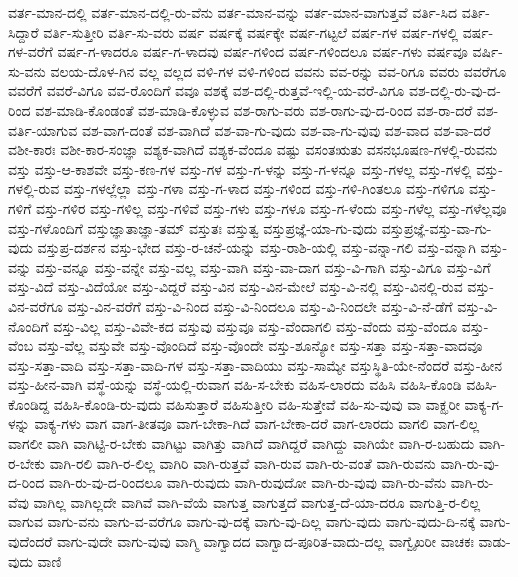{ವರ್ತ-ಮಾನ-ದಲ್ಲಿ
ವರ್ತ-ಮಾನ-ದಲ್ಲಿ-ರು-ವೆನು
ವರ್ತ-ಮಾನ-ವನ್ನು
ವರ್ತ-ಮಾನ-ವಾಗುತ್ತವೆ
ವರ್ತಿ-ಸಿದ
ವರ್ತಿ-ಸಿದ್ದಾರೆ
ವರ್ತಿ-ಸುತ್ತೀರಿ
ವರ್ತಿ-ಸು-ವರು
ವರ್ಷ
ವರ್ಷಕ್ಕೆ
ವರ್ಷಕ್ಕೇ
ವರ್ಷ-ಗಟ್ಟಲೆ
ವರ್ಷ-ಗಳ
ವರ್ಷ-ಗಳಲ್ಲಿ
ವರ್ಷ-ಗಳ-ವರೆಗೆ
ವರ್ಷ-ಗ-ಳಾದರೂ
ವರ್ಷ-ಗ-ಳಾದವು
ವರ್ಷ-ಗಳಿಂದ
ವರ್ಷ-ಗಳಿಂದಲೂ
ವರ್ಷ-ಗಳು
ವರ್ಷವೂ
ವರ್ಷಿ-ಸು-ವನು
ವಲಯ-ದೊಳ-ಗಿನ
ವಲ್ಲ
ವಲ್ಲದ
ವಳಿ-ಗಳ
ವಳಿ-ಗಳಿಂದ
ವವನು
ವವ-ರನ್ನು
ವವ-ರಿಗೂ
ವವರು
ವವರೆಗೂ
ವವರೆಗೆ
ವವರೆ-ವಿಗೂ
ವವ-ರೊಂದಿಗೆ
ವವೂ
ವಶಕ್ಕೆ
ವಶ-ದಲ್ಲಿ-ರುತ್ತವೆ-ಇಲ್ಲಿ-ಯ-ವರೆ-ವಿಗೂ
ವಶ-ದಲ್ಲಿ-ರು-ವು-ದ-ರಿಂದ
ವಶ-ಮಾಡಿ-ಕೊಂಡಂತೆ
ವಶ-ಮಾಡಿ-ಕೊಳ್ಳುವ
ವಶ-ರಾಗು-ವರು
ವಶ-ರಾಗು-ವು-ದ-ರಿಂದ
ವಶ-ರಾ-ದರೆ
ವಶ-ವರ್ತಿ-ಯಾಗುವ
ವಶ-ವಾಗ-ದಂತೆ
ವಶ-ವಾಗಿದೆ
ವಶ-ವಾ-ಗು-ವುದು
ವಶ-ವಾ-ಗು-ವುವು
ವಶ-ವಾದ
ವಶ-ವಾ-ದರೆ
ವಶೀ-ಕಾರಃ
ವಶೀ-ಕಾರ-ಸಂಜ್ಞಾ
ವಶ್ಯಕ-ವಾಗಿದೆ
ವಶ್ಯಕ-ವೆಂದೂ
ವಷ್ಟು
ವಸಂತಋತು
ವಸನಭೂಷಣ-ಗಳಲ್ಲಿ-ರುವನು
ವಸ್ತು
ವಸ್ತು-ಆ-ಕಾಶವೇ
ವಸ್ತು-ಕಣ-ಗಳ
ವಸ್ತು-ಗಳ
ವಸ್ತು-ಗ-ಳನ್ನು
ವಸ್ತು-ಗ-ಳನ್ನೂ
ವಸ್ತು-ಗಳಲ್ಲ
ವಸ್ತು-ಗಳಲ್ಲಿ
ವಸ್ತು-ಗಳಲ್ಲಿ-ರುವ
ವಸ್ತು-ಗಳಲ್ಲೆಲ್ಲಾ
ವಸ್ತು-ಗಳಾ
ವಸ್ತು-ಗ-ಳಾದ
ವಸ್ತು-ಗಳಿಂದ
ವಸ್ತು-ಗಳಿ-ಗಿಂತಲೂ
ವಸ್ತು-ಗಳಿಗೂ
ವಸ್ತು-ಗಳಿಗೆ
ವಸ್ತು-ಗಳಿರ
ವಸ್ತು-ಗಳಿಲ್ಲ
ವಸ್ತು-ಗಳಿವೆ
ವಸ್ತು-ಗಳು
ವಸ್ತು-ಗಳೂ
ವಸ್ತು-ಗ-ಳೆಂದು
ವಸ್ತು-ಗಳೆಲ್ಲ
ವಸ್ತು-ಗಳೆಲ್ಲವೂ
ವಸ್ತು-ಗಳೊಂದಿಗೆ
ವಸ್ತುಜ್ಞಾತಾಜ್ಞಾ-ತಮ್
ವಸ್ತುತಃ
ವಸ್ತುತ್ವ
ವಸ್ತುಪ್ರಜ್ಞೆ-ಯಾ-ಗು-ವುದು
ವಸ್ತುಪ್ರಜ್ಞೆ-ವಸ್ತು-ವಾ-ಗು-ವುದು
ವಸ್ತುಪ್ರ-ದರ್ಶನ
ವಸ್ತು-ಭೇದ
ವಸ್ತು-ರ-ಚನೆ-ಯನ್ನು
ವಸ್ತು-ರಾಶಿ-ಯಲ್ಲಿ
ವಸ್ತು-ವನ್ನಾ-ಗಲಿ
ವಸ್ತು-ವನ್ನಾಗಿ
ವಸ್ತು-ವನ್ನು
ವಸ್ತು-ವನ್ನೂ
ವಸ್ತು-ವನ್ನೇ
ವಸ್ತು-ವಲ್ಲ
ವಸ್ತು-ವಾಗಿ
ವಸ್ತು-ವಾ-ದಾಗ
ವಸ್ತು-ವಿ-ಗಾಗಿ
ವಸ್ತು-ವಿಗೂ
ವಸ್ತು-ವಿಗೆ
ವಸ್ತು-ವಿದೆ
ವಸ್ತು-ವಿದೆಯೋ
ವಸ್ತು-ವಿದ್ದರೆ
ವಸ್ತು-ವಿನ
ವಸ್ತು-ವಿನ-ಮೇಲೆ
ವಸ್ತು-ವಿ-ನಲ್ಲಿ
ವಸ್ತು-ವಿನಲ್ಲಿ-ರುವ
ವಸ್ತು-ವಿನ-ವರೆಗೂ
ವಸ್ತು-ವಿನ-ವರೆಗೆ
ವಸ್ತು-ವಿ-ನಿಂದ
ವಸ್ತು-ವಿ-ನಿಂದಲೂ
ವಸ್ತು-ವಿ-ನಿಂದಲೇ
ವಸ್ತು-ವಿ-ನೆ-ಡೆಗೆ
ವಸ್ತು-ವಿ-ನೊಂದಿಗೆ
ವಸ್ತು-ವಿಲ್ಲ
ವಸ್ತು-ವಿವೇ-ಕದ
ವಸ್ತುವು
ವಸ್ತುವೂ
ವಸ್ತು-ವೆಂದಾಗಲಿ
ವಸ್ತು-ವೆಂದು
ವಸ್ತು-ವೆಂದೂ
ವಸ್ತು-ವೆಂಬ
ವಸ್ತು-ವೆಲ್ಲ
ವಸ್ತುವೇ
ವಸ್ತು-ವೊಂದಿದೆ
ವಸ್ತು-ವೊಂದೇ
ವಸ್ತು-ಶೂನ್ಯೋ
ವಸ್ತು-ಸತ್ತಾ
ವಸ್ತು-ಸತ್ತಾ-ವಾದವೂ
ವಸ್ತು-ಸತ್ತಾ-ವಾದಿ
ವಸ್ತು-ಸತ್ತಾ-ವಾದಿ-ಗಳ
ವಸ್ತು-ಸತ್ತಾ-ವಾದಿಯು
ವಸ್ತು-ಸಾಮ್ಯೇ
ವಸ್ತುಸ್ಥಿತಿ-ಯೇ-ನೆಂದರೆ
ವಸ್ತು-ಹೀನ
ವಸ್ತು-ಹೀನ-ವಾಗಿ
ವಸ್ಥೆ-ಯನ್ನು
ವಸ್ಥೆ-ಯಲ್ಲಿ-ರುವಾಗ
ವಹಿ-ಸ-ಬೇಕು
ವಹಿಸ-ಲಾರದು
ವಹಿಸಿ
ವಹಿಸಿ-ಕೊಂಡಿ
ವಹಿಸಿ-ಕೊಂಡಿದ್ದ
ವಹಿಸಿ-ಕೊಂಡಿ-ರು-ವುದು
ವಹಿಸುತ್ತಾರೆ
ವಹಿಸುತ್ತೀರಿ
ವಹಿ-ಸುತ್ತೇವೆ
ವಹಿ-ಸು-ವುವು
ವಾ
ವಾಕ್ಝರೀ
ವಾಕ್ಯ-ಗ-ಳನ್ನು
ವಾಕ್ಯ-ಗಳು
ವಾಗ
ವಾಗ-ತೀತವೂ
ವಾಗ-ಬೇಕಾ-ಗಿದೆ
ವಾಗ-ಬೇಕಾ-ದರೆ
ವಾಗ-ಲಾರದು
ವಾಗಲಿ
ವಾಗ-ಲಿಲ್ಲ
ವಾಗಲೀ
ವಾಗಿ
ವಾಗಿಟ್ಟಿ-ರ-ಬೇಕು
ವಾಗಿಟ್ಟು
ವಾಗಿತ್ತು
ವಾಗಿದೆ
ವಾಗಿದ್ದರೆ
ವಾಗಿದ್ದು
ವಾಗಿಯೇ
ವಾಗಿ-ರ-ಬಹುದು
ವಾಗಿ-ರ-ಬೇಕು
ವಾಗಿ-ರಲಿ
ವಾಗಿ-ರ-ಲಿಲ್ಲ
ವಾಗಿರಿ
ವಾಗಿ-ರುತ್ತವೆ
ವಾಗಿ-ರುವ
ವಾಗಿ-ರು-ವಂತೆ
ವಾಗಿ-ರುವನು
ವಾಗಿ-ರು-ವು-ದ-ರಿಂದ
ವಾಗಿ-ರು-ವು-ದ-ರಿಂದಲೂ
ವಾಗಿ-ರುವುದು
ವಾಗಿ-ರುವುದೋ
ವಾಗಿ-ರು-ವುವು
ವಾಗಿ-ರು-ವೆನು
ವಾಗಿ-ರು-ವೆವು
ವಾಗಿಲ್ಲ
ವಾಗಿಲ್ಲದೇ
ವಾಗಿವೆ
ವಾಗಿ-ವೆಯೆ
ವಾಗುತ್ತ
ವಾಗುತ್ತದೆ
ವಾಗುತ್ತ-ದೆ-ಯಾ-ದರೂ
ವಾಗುತ್ತಿ-ರ-ಲಿಲ್ಲ
ವಾಗುವ
ವಾಗು-ವನು
ವಾಗು-ವ-ವರೆಗೂ
ವಾಗು-ವು-ದಕ್ಕೆ
ವಾಗು-ವು-ದಿಲ್ಲ
ವಾಗು-ವುದು
ವಾಗು-ವುದು-ದಿ-ನಕ್ಕೆ
ವಾಗು-ವುದೆಂದರೆ
ವಾಗು-ವುದೇ
ವಾಗು-ವುವು
ವಾಗ್ಮಿ
ವಾಗ್ವಾದದ
ವಾಗ್ವಾದ-ಪೂರಿತ-ವಾದು-ದಲ್ಲ
ವಾಗ್ವೈಖರೀ
ವಾಚಕಃ
ವಾಡು-ವುದು
ವಾಣಿ
}
